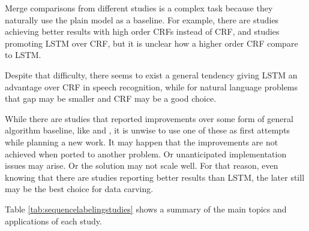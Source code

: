 \begin{enumerate}[listparindent=\parindent,itemindent=\parindent,label=\textbf{RQ\arabic*.}]
    Merge comparisons from different studies is a complex task because they naturally use the plain model as a baseline. For example, there are studies achieving better results with high order CRFs instead of CRF, and studies promoting LSTM over CRF, but it is unclear how a higher order CRF compare to LSTM.
    
    Despite that difficulty, there seems to exist a general tendency giving LSTM an advantage over CRF in speech recognition, while for natural language problems that gap may be smaller and CRF may be a good choice.
    
    While there are studies that reported improvements over some form of general algorithm baseline, like \cite{zhang_nonrecurrent_2017} and \cite{zhao_recurrent_2017}, it is unwise to use one of these as first attempts while planning a new work. It may happen that the improvements are not achieved when ported to another problem. Or unanticipated implementation issues may arise. Or the solution may not scale well. For that reason, even knowing that there are studies reporting better results than LSTM, the later still may be the best choice for data carving.

    Table \ref{tab:sequencelabelingstudies} shows a summary of the main topics and applications of each study.
\end{enumerate}


